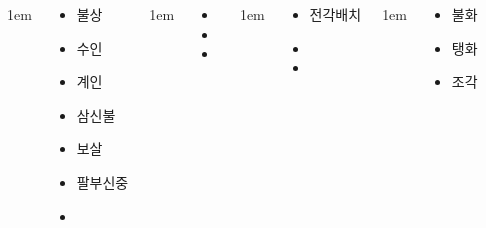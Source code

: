 \documentclass[20pt, a0paper, landscape]{tikzposter}
\begin{document}
\begin{columns}


			{
					\setlength{\leftmargini}{4em}
					\setlength{\labelsep} {1em}
				\begin{LARGE}
					\begin{itemize}
					\item 불상 
					\item 수인
					\item 계인
					\item 삼신불
					\item 보살
					\item 팔부신중
					\item 

					\end{itemize}
				\end{LARGE}
			} %


			{
					\setlength{\leftmargini}{4em}
					\setlength{\labelsep} {1em}
				\begin{LARGE}
					\begin{itemize}
					\item 
					\item 
					\item 
					\end{itemize}
				\end{LARGE}
			} %



			{
					\setlength{\leftmargini}{4em}
					\setlength{\labelsep} {1em}
				\begin{LARGE}
					\begin{itemize}
					\item 전각배치
					\item 
					\item 
					\end{itemize}
				\end{LARGE}
			} %


			{
					\setlength{\leftmargini}{4em}
					\setlength{\labelsep} {1em}
				\begin{LARGE}
					\begin{itemize}
					\item 불화
					\item 탱화
					\item 조각 
					\end{itemize}
				\end{LARGE}
			} %




\end{columns}
\end{document}

